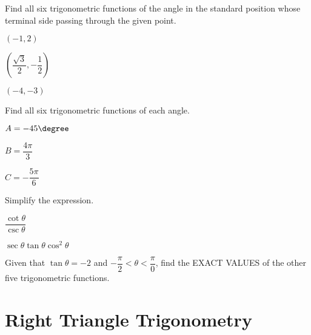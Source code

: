 \begin{exercise}
  Find all six trigonometric functions of the angle in the standard position whose terminal side passing through the given point.\\
  \begin{enumerate*}
    \item $(-1, 2)$
    \item $(\dfrac{\sqrt{3}}{2}, -\dfrac{1}{2})$
    \item $(-4, -3)$
  \end{enumerate*}
\end{exercise}

\begin{exercise}
  Find all six trigonometric functions of each angle.\\
  \begin{enumerate*}
    \item $A=-45\degree$
    \item $B=\dfrac{4\pi}{3}$
    \item $C=-\dfrac{5\pi}{6}$
  \end{enumerate*}
\end{exercise}

\newpage

\begin{exercise}
  Simplify the expression.\\
  \begin{enumerate*}
    \item $\dfrac{\cot\theta}{\csc\theta}$
    \item $\sec\theta\tan\theta\cos^2\theta$\hfill\null
  \end{enumerate*}
\end{exercise}

\begin{exercise}
  Given that $\tan\theta=-2$ and $-\dfrac{\pi}{2}<\theta<\dfrac{\pi}{0}$, find the EXACT VALUES of the other five trigonometric functions.
\end{exercise}

\newpage

\section{Right Triangle Trigonometry}


